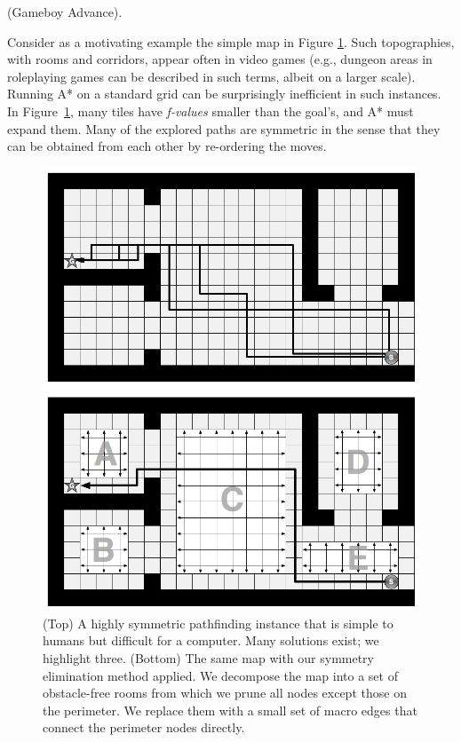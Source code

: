 (Gameboy Advance). 
\par
Consider as a motivating example the simple map in Figure \ref{fig-overview}.
Such topographies, with rooms and corridors, appear often in video games 
(e.g., dungeon areas in roleplaying games
can be described in such terms, albeit on a larger scale).
Running A* on a standard grid can be surprisingly inefficient in such instances.
In Figure~\ref{fig-overview}, many tiles have \emph{f-values} smaller than the goal's,
and A* must expand them.
Many of the explored paths are symmetric in the sense that they can be obtained from each other
by re-ordering the moves.

\begin{figure}[tb]
       \begin{center}
                       \includegraphics[scale=0.30, trim = 10mm 10mm 10mm 0mm]{diagrams/overview.png}
       \end{center}
	\vspace{-3pt}
       \caption{(Top) A highly symmetric pathfinding instance that is simple to humans but difficult 
				for a computer.
				Many solutions exist; we highlight three. 
				(Bottom) The same map with our symmetry elimination method applied. We decompose the map
				into a set of obstacle-free rooms from which we prune all nodes except those on the perimeter.
				We replace them with a small set of macro edges that connect the perimeter nodes directly.} 
       \label{fig-overview}
\end{figure}

